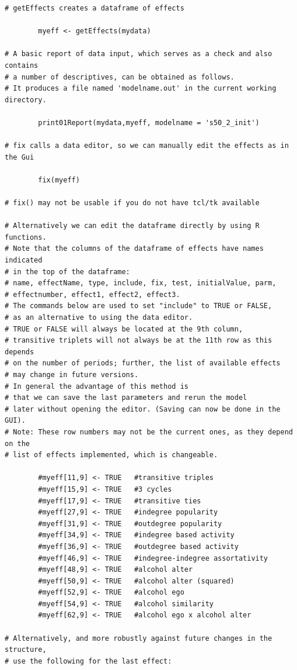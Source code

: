 \documentclass[a4paper,fleqn]{article}
\newcommand{\+}{\, + \,}
\begin{document}
{\begin{verbatim}
# getEffects creates a dataframe of effects

        myeff <- getEffects(mydata)

# A basic report of data input, which serves as a check and also contains
# a number of descriptives, can be obtained as follows.
# It produces a file named 'modelname.out' in the current working directory.

        print01Report(mydata,myeff, modelname = 's50_2_init')

# fix calls a data editor, so we can manually edit the effects as in the Gui

        fix(myeff)

# fix() may not be usable if you do not have tcl/tk available

# Alternatively we can edit the dataframe directly by using R functions.
# Note that the columns of the dataframe of effects have names indicated
# in the top of the dataframe:
# name, effectName, type, include, fix, test, initialValue, parm,
# effectnumber, effect1, effect2, effect3.
# The commands below are used to set "include" to TRUE or FALSE,
# as an alternative to using the data editor.
# TRUE or FALSE will always be located at the 9th column,
# transitive triplets will not always be at the 11th row as this depends
# on the number of periods; further, the list of available effects
# may change in future versions.
# In general the advantage of this method is
# that we can save the last parameters and rerun the model
# later without opening the editor. (Saving can now be done in the GUI).
# Note: These row numbers may not be the current ones, as they depend on the
# list of effects implemented, which is changeable.

        #myeff[11,9] <- TRUE   #transitive triples
        #myeff[15,9] <- TRUE   #3 cycles
        #myeff[17,9] <- TRUE   #transitive ties
        #myeff[27,9] <- TRUE   #indegree popularity
        #myeff[31,9] <- TRUE   #outdegree popularity
        #myeff[34,9] <- TRUE   #indegree based activity
        #myeff[36,9] <- TRUE   #outdegree based activity
        #myeff[46,9] <- TRUE   #indegree-indegree assortativity
        #myeff[48,9] <- TRUE   #alcohol alter
        #myeff[50,9] <- TRUE   #alcohol alter (squared)
        #myeff[52,9] <- TRUE   #alcohol ego
        #myeff[54,9] <- TRUE   #alcohol similarity
        #myeff[62,9] <- TRUE   #alcohol ego x alcohol alter

# Alternatively, and more robustly against future changes in the structure,
# use the following for the last effect:


\end{verbatim}}
\end{document}

